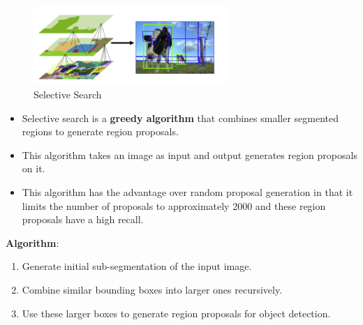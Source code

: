 \begin{table}[h]
    \begin{minipage}[t]{0.39\linewidth}
        \begin{figure}[H]
            \centering
            \includegraphics[width=\linewidth, height=3cm, keepaspectratio]{Pictures/convolutional-neural-network/rcnn-selective-search.png}
            \caption{Selective Search}
        \end{figure}        
    \end{minipage}
    \hfill
    \begin{minipage}[t]{0.59\linewidth}
        \begin{itemize}
            \item Selective search is a \textbf{greedy algorithm} that combines smaller segmented regions to generate region proposals.
            
            \item This algorithm takes an image as input and output generates region proposals on it.
        
            \item This algorithm has the advantage over random proposal generation in that it limits the number of proposals to approximately 2000 and these region proposals have a high recall.
        \end{itemize}    
    \end{minipage}
\end{table}


\vspace{0.2cm}
\textbf{Algorithm}:
\begin{enumerate}
    \item Generate initial sub-segmentation of the input image.

    \item Combine similar bounding boxes into larger ones recursively.

    \item Use these larger boxes to generate region proposals for object detection.
\end{enumerate}

